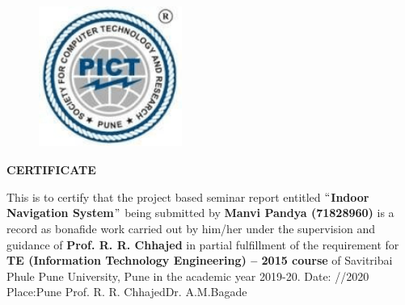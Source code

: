 ﻿\documentclass[a4paper, 12pt]{article}
\begin{document}
\begin{titlepage}
\begin{figure}[H]
    \centering
		\includegraphics[width=1.84in,height=1.84in]{Pict_logo.png}
\end{figure}
\begin{center}
\textbf{{\LARGE CERTIFICATE}}
\end{center}

This is to certify that the project based seminar report entitled
\textbf{\textcolor[HTML]{FF0000}{$``$Indoor Navigation System$"$ }} being submitted by \textbf{\textcolor[HTML]{FF0000}{Manvi Pandya  (71828960)}} is a record as bonafide work carried out by him/her under the supervision and guidance of \textbf{\textcolor[HTML]{FF0000}{Prof. R. R. Chhajed}} in partial fulfillment
of the requirement for \textbf{TE (Information Technology Engineering) -- 2015 
course} of Savitribai Phule Pune University, Pune in the academic year 2019-20.
\linebreak
\linebreak
\linebreak
\linebreak
\linebreak
\linebreak
\linebreak
\linebreak
\linebreak
Date:\hspace{15pt} /\hspace{15pt}/2020\hspace{400pt}
\linebreak
\linebreak
Place:\hspace{15pt}Pune\hspace{15pt}\hspace{15pt}\hspace{15pt}\hspace{15pt}\hspace{15pt}\hspace{15pt}\hspace{15pt}\hspace{15pt}
\linebreak
\linebreak
\textcolor[HTML]{FF0000}{Prof. R. R. Chhajed}\hspace{200pt}\textcolor[HTML]{FF0000}{Dr. A.M.Bagade}


\end{titlepage}
\end{document}
